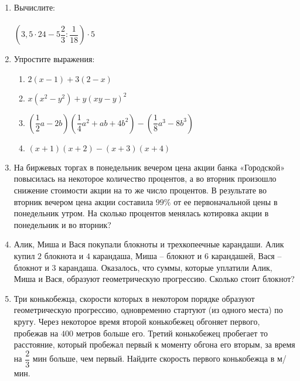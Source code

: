 \documentclass[12pt, a4paper]{article}
\begin{document}
	
	\begin{enumerate}
		\item Вычислите:\\\\
		$\left( 3,5 \cdot 24 - 5\dfrac{2}{3}:\dfrac{1}{18}\right)\cdot 5 $
		\item Упростите выражения:
		\begin{multicols}{2}
			\begin{enumerate}[label=\asbuk*)]
				\item $2(x-1)+3(2-x)$
				\item $x(x^2-y^2)+y(xy-y)^2$
				\item $\left( \dfrac{1}{2}a-2b\right)\left( \dfrac{1}{4}a^2+ab+4b^2\right)-\left( \dfrac{1}{8}a^3-8b^3\right)$
				\item $(x+1)(x+2)-(x+3)(x+4)$
			\end{enumerate}
		\end{multicols}
	\item На биржевых торгах в понедельник вечером цена акции банка «Городской» повысилась на некоторое количество процентов, а во вторник произошло снижение стоимости акции на то же число процентов. В результате во вторник вечером цена акции составила $99\%$ от ее первоначальной цены в понедельник утром. На сколько процентов менялась котировка акции в понедельник и во вторник?
	\item Алик, Миша и Вася покупали блокноты и трехкопеечные карандаши. Алик купил $2$ блокнота и $4$ карандаша, Миша – блокнот и $6$ карандашей, Вася – блокнот и $3$ карандаша. Оказалось, что суммы, которые уплатили Алик, Миша и Вася, образуют геометрическую прогрессию. Сколько стоит блокнот?
	\item Три конькобежца, скорости которых в некотором порядке образуют геометрическую прогрессию, одновременно стартуют (из одного места) по кругу. Через некоторое время второй конькобежец обгоняет первого, пробежав на $40$0 метров больше его. Третий конькобежец пробегает то расстояние, который пробежал первый к моменту обгона его вторым, за время на $\dfrac{2}{3}$ мин больше, чем первый. Найдите скорость первого конькобежца в м/мин.
	\end{enumerate}
\end{document}
